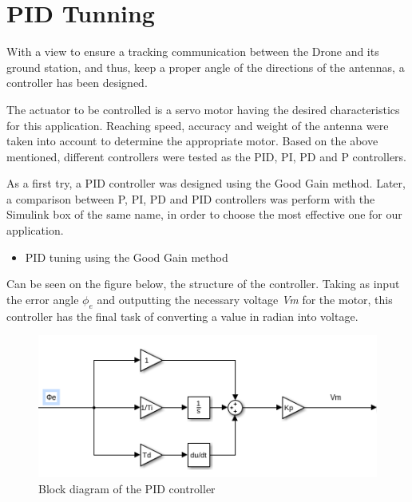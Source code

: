 \section{PID Tunning}\label{sec:pid_tunning}

With a view to ensure a tracking communication between the Drone and its ground station, and thus, keep a proper angle of the directions of the antennas, a controller has been designed.\par

The actuator to be controlled is a servo motor having the desired characteristics for this application.  Reaching speed, accuracy and weight of the antenna were taken into account to determine the appropriate motor. Based on the above mentioned, different controllers were tested as the PID, PI, PD and P controllers.\par 	
As a first try, a PID controller was designed using the Good Gain method. Later, a comparison between P, PI, PD and PID controllers was perform with the Simulink box of the same name, in order to choose the most effective one for our application.\par 	

\begin{Large}
  \begin{itemize}
   \item PID tuning using the Good Gain method
  \end{itemize}
\end{Large}

Can be seen on the figure below, the structure of the controller. Taking as input the error angle \textbf{$\phi_{e}$} and outputting the necessary voltage \textit{Vm} for the motor, this controller has the final task of converting a value in radian into voltage.\par

\begin{figure}[H]
  \centering
  \includegraphics[scale=0.5]{figures/PID_2D.png}
  \caption[LABEL] {Block diagram of the PID controller}
\end{figure}
  
